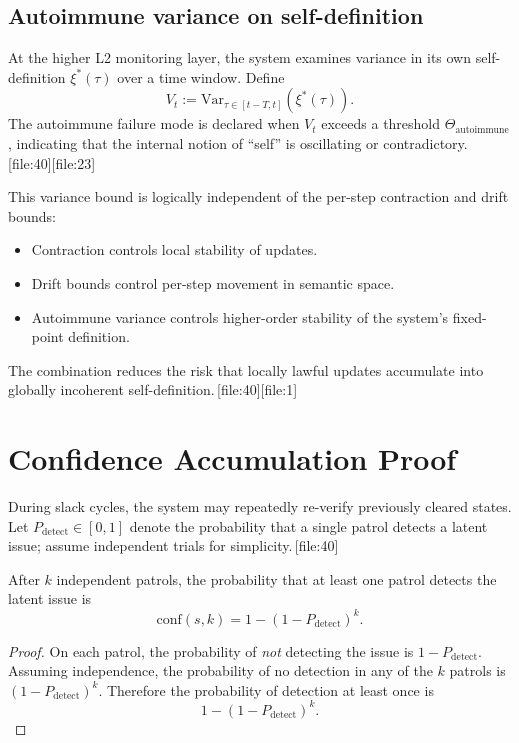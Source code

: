 \documentclass[11pt]{article}
\begin{document}
\subsection{Autoimmune variance on self-definition}

At the higher L2 monitoring layer, the system examines variance in its own self-definition \(\xi^*(\tau)\) over a time window.
Define
\[
V_{t} := \mathrm{Var}_{\tau\in[t-T,t]}(\xi^*(\tau)).
\]
The autoimmune failure mode is declared when \(V_t\) exceeds a threshold \(\Theta_{\mathrm{autoimmune}}\), indicating that the internal notion of “self” is oscillating or contradictory.\,[file:40][file:23]

This variance bound is logically independent of the per-step contraction and drift bounds:
\begin{itemize}
  \item Contraction controls local stability of updates.
  \item Drift bounds control per-step movement in semantic space.
  \item Autoimmune variance controls higher-order stability of the system’s fixed-point definition.
\end{itemize}
The combination reduces the risk that locally lawful updates accumulate into globally incoherent self-definition.\,[file:40][file:1]

\section{Confidence Accumulation Proof}

During slack cycles, the system may repeatedly re-verify previously cleared states.
Let \(P_{\mathrm{detect}}\in[0,1]\) denote the probability that a single patrol detects a latent issue; assume independent trials for simplicity.\,[file:40]

\begin{lemma}
After \(k\) independent patrols, the probability that at least one patrol detects the latent issue is
\[
\mathrm{conf}(s,k) = 1 - (1 - P_{\mathrm{detect}})^k.
\]
\end{lemma}

\begin{proof}
On each patrol, the probability of \emph{not} detecting the issue is \(1-P_{\mathrm{detect}}\).
Assuming independence, the probability of no detection in any of the \(k\) patrols is \((1-P_{\mathrm{detect}})^k\).
Therefore the probability of detection at least once is
\[
1 - (1-P_{\mathrm{detect}})^k.
\]
\end{proof}
\end{document}
